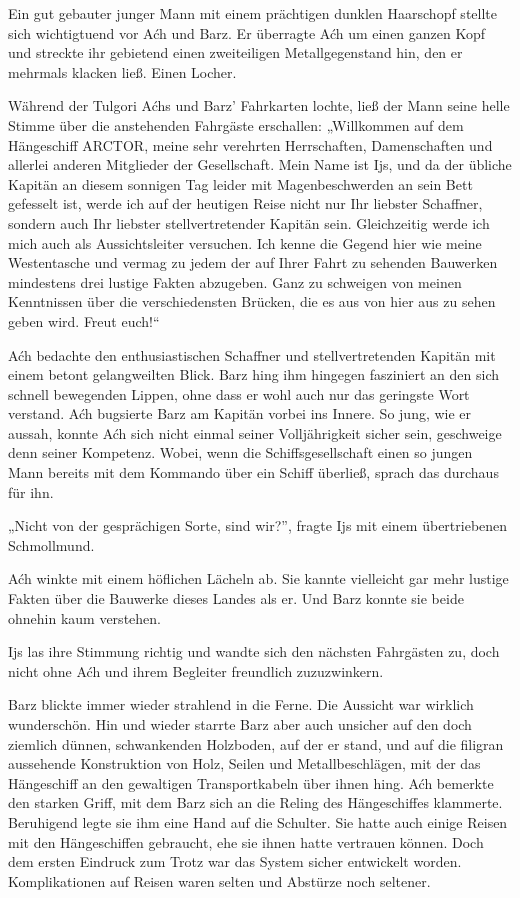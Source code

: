 Ein gut gebauter junger Mann mit einem prächtigen dunklen Haarschopf stellte sich wichtigtuend vor Aćh und Barz. Er überragte Aćh um einen ganzen Kopf und streckte ihr gebietend einen zweiteiligen Metallgegenstand hin, den er mehrmals klacken ließ. Einen Locher.

Während der Tulgori Aćhs und Barz’ Fahrkarten lochte, ließ der Mann seine helle Stimme über die anstehenden Fahrgäste erschallen: „Willkommen auf dem Hängeschiff ARCTOR, meine sehr verehrten Herrschaften, Damenschaften und allerlei anderen Mitglieder der Gesellschaft. Mein Name ist Ijs, und da der übliche Kapitän an diesem sonnigen Tag leider mit Magenbeschwerden an sein Bett gefesselt ist, werde ich auf der heutigen Reise nicht nur Ihr liebster Schaffner, sondern auch Ihr liebster stellvertretender Kapitän sein. Gleichzeitig werde ich mich auch als Aussichtsleiter versuchen. Ich kenne die Gegend hier wie meine Westentasche und vermag zu jedem der auf Ihrer Fahrt zu sehenden Bauwerken mindestens drei lustige Fakten abzugeben. Ganz zu schweigen von meinen Kenntnissen über die verschiedensten Brücken, die es aus von hier aus zu sehen geben wird. Freut euch!“

Aćh bedachte den enthusiastischen Schaffner und stellvertretenden Kapitän mit einem betont gelangweilten Blick. Barz hing ihm hingegen fasziniert an den sich schnell bewegenden Lippen, ohne dass er wohl auch nur das geringste Wort verstand. Aćh bugsierte Barz am Kapitän vorbei ins Innere. So jung, wie er aussah, konnte Aćh sich nicht einmal seiner Volljährigkeit sicher sein, geschweige denn seiner Kompetenz. Wobei, wenn die Schiffsgesellschaft einen so jungen Mann bereits mit dem Kommando über ein Schiff überließ, sprach das durchaus für ihn.

„Nicht von der gesprächigen Sorte, sind wir?”, fragte Ijs mit einem übertriebenen Schmollmund.

Aćh winkte mit einem höflichen Lächeln ab. Sie kannte vielleicht gar mehr lustige Fakten über die Bauwerke dieses Landes als er. Und Barz konnte sie beide ohnehin kaum verstehen.

Ijs las ihre Stimmung richtig und wandte sich den nächsten Fahrgästen zu, doch nicht ohne Aćh und ihrem Begleiter freundlich zuzuzwinkern.

Barz blickte immer wieder strahlend in die Ferne. Die Aussicht war wirklich wunderschön. Hin und wieder starrte Barz aber auch unsicher auf den doch ziemlich dünnen, schwankenden Holzboden, auf der er stand, und auf die filigran aussehende Konstruktion von Holz, Seilen und Metallbeschlägen, mit der das Hängeschiff an den gewaltigen Transportkabeln über ihnen hing. Aćh bemerkte den starken Griff, mit dem Barz sich an die Reling des Hängeschiffes klammerte. Beruhigend legte sie ihm eine Hand auf die Schulter. Sie hatte auch einige Reisen mit den Hängeschiffen gebraucht, ehe sie ihnen hatte vertrauen können. Doch dem ersten Eindruck zum Trotz war das System sicher entwickelt worden. Komplikationen auf Reisen waren selten und Abstürze noch seltener.

